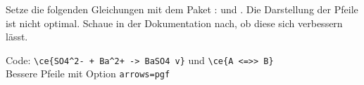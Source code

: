 \item Setze die folgenden Gleichungen mit dem Paket : 
     und . Die Darstellung der Pfeile 
    ist nicht optimal. Schaue in der Dokumentation nach, ob diese sich
    verbessern lässt.\label{mhchem}
\begin{loesung}
    Code: \verb|\ce{SO4^2- + Ba^2+ -> BaSO4 v}| und \verb|\ce{A <=>> B}|\\
    Bessere Pfeile mit Option \texttt{arrows=pgf}
\end{loesung}